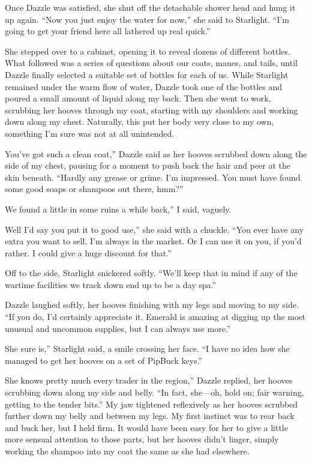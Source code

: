 Once Dazzle was satisfied, she shut off the detachable shower head and hung it up again. “Now you just enjoy the water for now,” she said to Starlight. “I’m going to get your friend here all lathered up real quick.”

She stepped over to a cabinet, opening it to reveal dozens of different bottles. What followed was a series of questions about our coats, manes, and tails, until Dazzle finally selected a suitable set of bottles for each of us. While Starlight remained under the warm flow of water, Dazzle took one of the bottles and poured a small amount of liquid along my back. Then she went to work, scrubbing her hooves through my coat, starting with my shoulders and working down along my chest. Naturally, this put her body very close to my own, something I’m sure was not at all unintended.

\leavevmode{}You’ve got such a clean coat,” Dazzle said as her hooves scrubbed down along the side of my chest, pausing for a moment to push back the hair and peer at the skin beneath. “Hardly any grease or grime. I’m impressed. You must have found some good soaps or shampoos out there, hmm?”

\leavevmode{}We found a little in some ruins a while back,” I said, vaguely.

\leavevmode{}Well I’d say you put it to good use,” she said with a chuckle. “You ever have any extra you want to sell, I’m always in the market. Or I can use it on you, if you’d rather. I could give a huge discount for that.”

Off to the side, Starlight snickered softly. “We’ll keep that in mind if any of the wartime facilities we track down end up to be a day spa.”

Dazzle laughed softly, her hooves finishing with my legs and moving to my side. “If you do, I’d certainly appreciate it. Emerald is amazing at digging up the most unusual and uncommon supplies, but I can always use more.”

\leavevmode{}She sure is,” Starlight said, a smile crossing her face. “I have no idea how she managed to get her hooves on a set of PipBuck keys.”

\leavevmode{}She knows pretty much every trader in the region,” Dazzle replied, her hooves scrubbing down along my side and belly. “In fact, she—oh, hold on; fair warning, getting to the tender bits.” My jaw tightened reflexively as her hooves scrubbed further down my belly and between my legs. My first instinct was to rear back and buck her, but I held firm. It would have been easy for her to give a little more sensual attention to those parts, but her hooves didn’t linger, simply working the shampoo into my coat the same as she had elsewhere.

